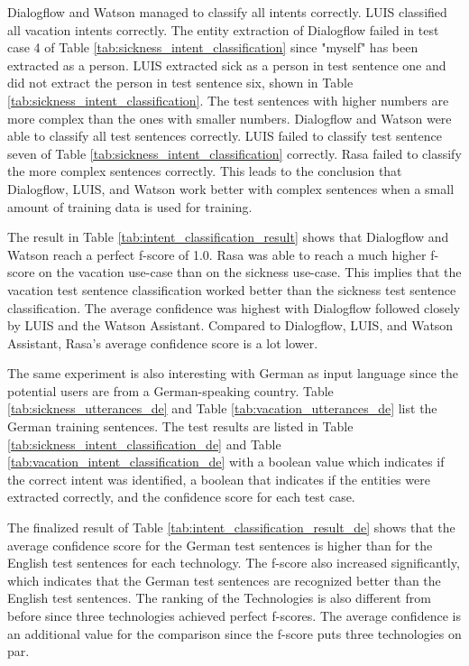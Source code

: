 Dialogflow and Watson managed to classify all intents correctly.
LUIS classified all vacation intents correctly.
The entity extraction of Dialogflow failed in test case 4 of Table \ref{tab:sickness_intent_classification} since "myself" has been extracted as a person.
LUIS extracted sick as a person in test sentence one and did not extract the person in test sentence six, shown in Table \ref{tab:sickness_intent_classification}.
The test sentences with higher numbers are more complex than the ones with smaller numbers.
Dialogflow and Watson were able to classify all test sentences correctly.
LUIS failed to classify test sentence seven of Table \ref{tab:sickness_intent_classification} correctly.
Rasa failed to classify the more complex sentences correctly.
This leads to the conclusion that Dialogflow, LUIS, and Watson work better with complex sentences when a small amount of training data is used for training.

The result in Table \ref{tab:intent_classification_result} shows that 
Dialogflow and Watson reach a perfect f-score of 1.0.
Rasa was able to reach a much higher f-score on the vacation use-case than on the sickness use-case.
This implies that the vacation test sentence classification worked better than the sickness test sentence classification. 
The average confidence was highest with Dialogflow followed 
closely by LUIS and the Watson Assistant.
Compared to Dialogflow, LUIS, and Watson Assistant, Rasa's average confidence score is a lot lower.

The same experiment is also interesting with German as input language since the potential users are from a German-speaking country.
Table \ref{tab:sickness_utterances_de} and 
Table \ref{tab:vacation_utterances_de} list the German training sentences.
The test results are listed in Table \ref{tab:sickness_intent_classification_de} 
and Table \ref{tab:vacation_intent_classification_de} with a boolean value which indicates if the correct intent was identified, a boolean that indicates if the entities were extracted correctly,
and the confidence score for each test case.

The finalized result of Table \ref{tab:intent_classification_result_de} shows that the average confidence score for the German test sentences is higher than for the English test sentences for each technology.
The f-score also increased significantly, which indicates that the German test sentences are recognized better than the English test sentences.
The ranking of the Technologies is also different from before since three technologies achieved perfect f-scores.
The average confidence is an additional value for the comparison since the f-score puts three technologies on par.

